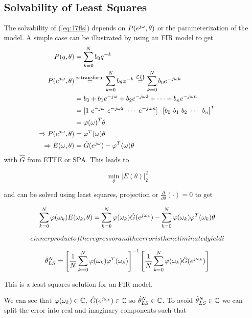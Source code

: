 \subsection{Solvability of Least Squares}
The solvability of (\ref{eq:17fls}) depends on $P(e^{j\omega},\theta)$ or the parameterization of the model.
A simple case can be illustrated by using an FIR model to get
\begin{align*}
P(q,\theta) &= \sum_{k=0}^N b_0q^{-k} \\
P(e^{j\omega},\theta) &\stackrel{\text{z-transform}}{=} \sum_{k=0}^N b_\theta z^{-k} \stackrel{\mathcal{L}\{\}}{=} \sum_{k=0}^N b_0e^{-j\omega k} \\
&= b_0 + b_1e^{-j\omega} + b_2e^{-j\omega 2} + \cdots + b_n e^{-j\omega n} \\
&= [1~e^{-j\omega}~e^{-j\omega 2}~\cdots~e^{-j\omega n}] \cdot {[b_0~b_1~b_2~\cdots~b_n]}^T \\
&= \varphi{(\omega)}^T\theta \\
\Rightarrow P(e^{j\omega},\theta) &= \varphi^T(\omega)\theta \\
\Rightarrow E(\omega,\theta) &= \hat{G}(e^{j\omega})-\varphi^T(\omega)\theta
\end{align*}
with $\hat{G}$ from ETFE or SPA\@.
This leads to

\begin{equation*}
\min_\theta|E(\theta)|_2^2
\end{equation*}

and can be solved using least squares, projection or $\tfrac{\partial}{\partial\theta}(\cdot)=0$ to get

\begin{equation*}
\sum_{k=0}^N\varphi(\omega_k)E(\omega_k,\theta) = \sum_{k=0}^N\varphi(\omega_k)\hat{G}(e^{j\omega_k}) - \sum_{k=0}^N\varphi(\omega_k)\varphi^T(\omega_k)\theta
\end{equation*}

\begin{equation*}
e inner product of the regressor and the error is then eliminated yieldi
\end{equation*}

\begin{equation*}
\hat{\theta}_{LS}^N = {\left[\frac{1}{N}\sum_{k=0}^N\varphi(\omega_k)\varphi^T(\omega_k)\right]}^{-1}\left[\frac{1}{N}\sum_{k=0}^N\varphi(\omega_k)\hat{G}(e^{j\omega_k})\right]
\end{equation*}

This is a least squares solution for an FIR model.

We can see that $\varphi(\omega_k)\in\mathbb{C}$, $\hat{G}(e^{j\omega_k})\in\mathbb{C}$ so $\hat{\theta}_{LS}^N\in\mathbb{C}$.
To avoid $\hat{\theta}_{LS}^N\in\mathbb{C}$ we can split the error into real and imaginary components such that

